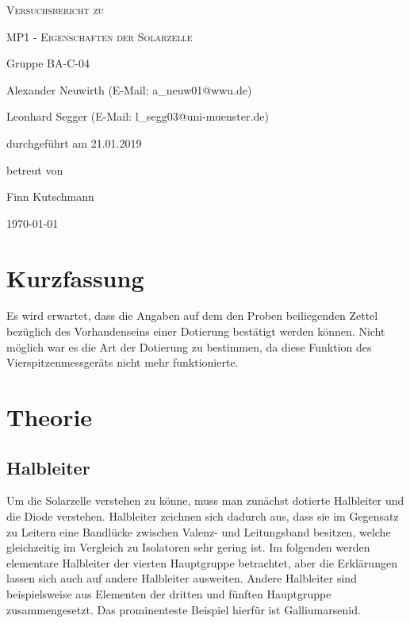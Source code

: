 \documentclass[
	a4paper,
	12pt,
	pagesize,
	ngerman
]{scrartcl}
\begin{document}
	\begin{titlepage}
		\centering
		{\scshape\LARGE Versuchsbericht zu \par}
		\vspace{1cm}
		{\scshape\huge MP1 - Eigenschaften der Solarzelle \par} %
		\vspace{2.5cm}
		{\LARGE Gruppe BA-C-04 \par}
		\vspace{0.5cm}

		{\large Alexander Neuwirth (E-Mail: a\_neuw01@wwu.de) \par}
		{\large Leonhard Segger (E-Mail: l\_segg03@uni-muenster.de) \par}
		\vfill

		durchgeführt am 21.01.2019\par
		betreut von\par
		{\large Finn Kutschmann}

		\vfill

		{\large \today\par}
	\end{titlepage}
	\tableofcontents
	\newpage


	\section{Kurzfassung}

	Es wird erwartet, dass die Angaben auf dem den Proben beiliegenden Zettel bezüglich des Vorhandenseins einer Dotierung bestätigt werden können.
	Nicht möglich war es die Art der Dotierung zu bestimmen, da diese Funktion des Vierspitzenmessgeräts nicht mehr funktionierte. %

  \section{Theorie}



	\subsection{Halbleiter}
	Um die Solarzelle verstehen zu könne, muss man zunächst dotierte Halbleiter und die Diode verstehen.
	Halbleiter zeichnen sich dadurch aus, dass sie im Gegensatz zu Leitern eine Bandlücke zwischen Valenz- und Leitungsband besitzen, welche gleichzeitig im Vergleich zu Isolatoren sehr gering ist.
	Im folgenden werden elementare Halbleiter der vierten Hauptgruppe betrachtet, aber die Erklärungen lassen sich auch auf andere Halbleiter ausweiten.
	Andere Halbleiter sind beispielsweise aus Elementen der dritten und fünften Hauptgruppe zusammengesetzt.
	Das prominenteste Beispiel hierfür ist Galliumarsenid.
\end{document}
